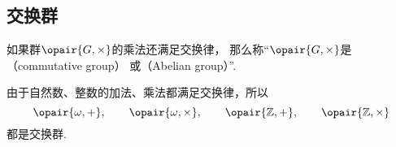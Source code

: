 \subsection{交换群}
\begin{definition}
如果群\(\opair{G,\times}\)的乘法还满足交换律，
那么称“\(\opair{G,\times}\)是（commutative group）%
或（Abelian group）”.
\end{definition}

由于自然数、整数的加法、乘法都满足交换律，所以\[
	\opair{\omega,+}, \qquad
	\opair{\omega,\times}, \qquad
	\opair{\mathbb{Z},+}, \qquad
	\opair{\mathbb{Z},\times}
\]都是交换群.
